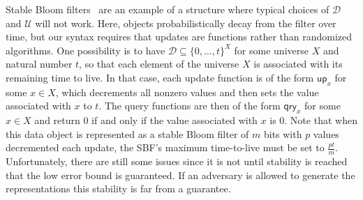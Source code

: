 \documentclass[11pt, pdftex]{article}
\begin{document}
Stable Bloom filters~\cite{xxx} are an example of a structure where typical choices of $\mathcal{D}$ and $\mathcal{U}$ will not work. Here, objects probabilistically decay from the filter over time, but our syntax requires that updates are functions rather than randomized algorithms.   One possibility is to have $\mathcal{D} \subseteq \{0,\ldots,t\}^X$ for some universe $X$ and natural number $t$, so that each element of the universe $X$ is associated with its remaining time to live.   In that case, each update function is of the form $\mathsf{up}_x$ for some $x \in X$, which decrements all nonzero values and then sets the value associated with $x$ to $t$. The query functions are then of the form $\mathsf{qry}_x$ for some $x \in X$ and return 0 if and only if the value associated with $x$ is 0. Note that when this data object is represented as a stable Bloom filter of $m$ bits with $p$ values decremented each update, the SBF's maximum time-to-live must be set to $\frac{pt}{m}$. Unfortunately, there are still some issues since it is not until stability is reached that the low error bound is guaranteed. If an adversary is allowed to generate the representations this stability is far from a guarantee.
\end{document}
